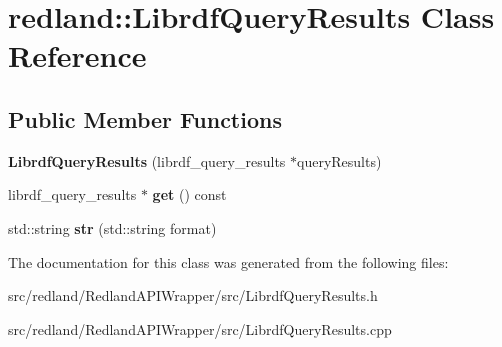 \hypertarget{classredland_1_1LibrdfQueryResults}{}\section{redland\+:\+:Librdf\+Query\+Results Class Reference}
\label{classredland_1_1LibrdfQueryResults}
\subsection*{Public Member Functions}
\begin{DoxyCompactItemize}
\item 
\mbox{\label{classredland_1_1LibrdfQueryResults_a8c9e17542c836ff3dd09da68bfc334f1}} 
{\bfseries Librdf\+Query\+Results} (librdf\+\_\+query\+\_\+results $\ast$query\+Results)
\item 
\mbox{\label{classredland_1_1LibrdfQueryResults_aa40ed7731b543dfc971b5acbb016cfee}} 
librdf\+\_\+query\+\_\+results $\ast$ {\bfseries get} () const
\item 
\mbox{\label{classredland_1_1LibrdfQueryResults_acb51d92dfce59fdc64bd475326b038bf}} 
std\+::string {\bfseries str} (std\+::string format)
\end{DoxyCompactItemize}


The documentation for this class was generated from the following files\+:\begin{DoxyCompactItemize}
\item 
src/redland/\+Redland\+A\+P\+I\+Wrapper/src/Librdf\+Query\+Results.\+h\item 
src/redland/\+Redland\+A\+P\+I\+Wrapper/src/Librdf\+Query\+Results.\+cpp\end{DoxyCompactItemize}
